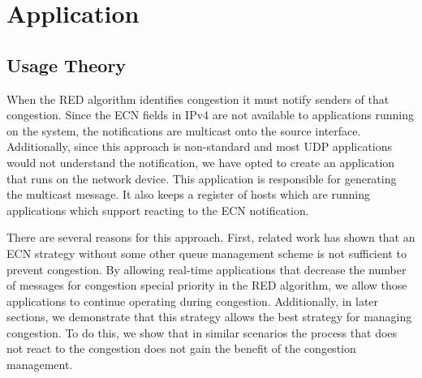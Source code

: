 
\section{Application}

\subsection{Usage Theory}
When the \ac{RED} algorithm identifies congestion it must notify senders of that congestion.
Since the \ac{ECN} fields in IPv4 are not available to applications running on the system, the notifications are multicast onto the source interface.
Additionally, since this approach is non-standard and most UDP applications would not understand the notification, we have opted to create an application that runs on the network device.
This application is responsible for generating the multicast message.
It also keeps a register of hosts which are running applications which support reacting to the \ac{ECN} notification.

There are several reasons for this approach.
First, related work has shown that an \ac{ECN} strategy without some other queue management scheme is not sufficient to prevent congestion.
By allowing real-time applications that decrease the number of messages for congestion special priority in the \ac{RED} algorithm, we allow those applications to continue operating during congestion.
Additionally, in later sections, we demonstrate that this strategy allows the best strategy for managing congestion.
To do this, we show that in similar scenarios the process that does not react to the congestion does not gain the benefit of the congestion management.

